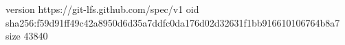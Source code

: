 version https://git-lfs.github.com/spec/v1
oid sha256:f59d91ff49c42a8950d6d35a7ddfc0da176d02d32631f1bb916610106764b8a7
size 43840
